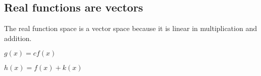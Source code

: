 
\subsection{Real functions are vectors}

The real function space is a vector space because it is linear in multiplication and addition.

\(g(x)=cf(x)\)

\(h(x)=f(x)+k(x)\)


